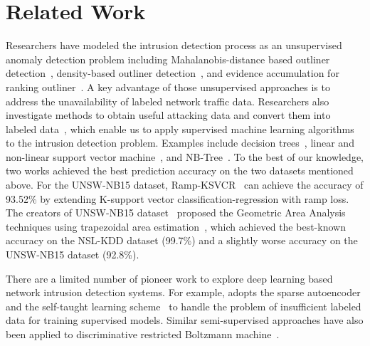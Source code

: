 \section{Related Work}
Researchers have modeled the intrusion detection process as an unsupervised
anomaly detection problem including Mahalanobis-distance based outliner detection~\cite{ComparativeAnomalyNIDS}, density-based outliner detection~\cite{LOF}, and evidence accumulation for ranking outliner~\cite{RankingOutliner}.
A key advantage of those unsupervised approaches is to address the unavailability of labeled network traffic data. Researchers also investigate methods to obtain useful attacking data and convert them into labeled data~\cite{KDDCup, NSL-KDD, UNSW}, which enable us to apply supervised machine learning algorithms to the intrusion detection problem.
Examples include decision trees~\cite{DecisionTree}, linear and non-linear support vector machine~\cite{SVM}, and NB-Tree~\cite{NB-Tree}. To the best of our knowledge, two works achieved the best prediction accuracy on the two datasets mentioned above.
For the UNSW-NB15 dataset, Ramp-KSVCR~\cite{RampLossKSVCR} can achieve the accuracy of 93.52\% by extending K-support vector classification-regression with ramp loss. 
The creators of UNSW-NB15 dataset~\cite{UNSW} proposed the Geometric Area Analysis techniques using trapezoidal area estimation~\cite{GAA-ADS}, which achieved the best-known accuracy on the NSL-KDD dataset (99.7\%) and
a slightly worse accuracy on the UNSW-NB15 dataset (92.8\%).

There are a limited number of pioneer work to explore deep learning based network intrusion detection systems.
For example, \cite{STL-NIDS} adopts the sparse autoencoder and the self-taught learning scheme~\cite{SparseAE} to handle the problem of insufficient labeled data for training supervised models.
Similar semi-supervised approaches have also been applied to discriminative restricted Boltzmann machine~\cite{AnomalyDetectionRBM}.
